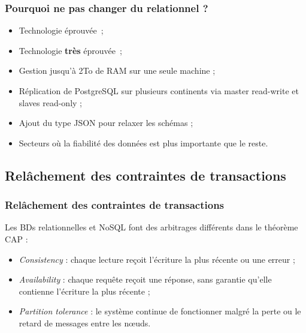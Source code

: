     \begin{frame}
        \frametitle{Pourquoi ne pas changer du relationnel ?}

        \begin{itemize}
            \item Technologie éprouvée ;
            \item Technologie \textbf{très} éprouvée ;
        \end{itemize}

        \begin{itemize}
            \item Gestion jusqu'à 2To de RAM sur une seule machine ;
            \item Réplication de PostgreSQL sur plusieurs continents via master read-write et slaves read-only ;
            \item Ajout du type JSON pour relaxer les schémas ;
            \item Secteurs où la fiabilité des données est plus importante que le reste.
        \end{itemize}
    \end{frame}

    \subsection{Relâchement des contraintes de transactions}
    \begin{frame}
        \frametitle{Relâchement des contraintes de transactions}

        Les BDs relationnelles et NoSQL font des arbitrages différents dans le théorème CAP :
        \begin{itemize}
            \item \textit{Consistency} : chaque lecture reçoit l'écriture la plus récente ou une erreur ;
            \item \textit{Availability} : chaque requête reçoit une réponse, sans garantie qu'elle contienne l'écriture la plus récente ;
            \item \textit{Partition tolerance} : le système continue de fonctionner malgré la perte ou le retard de messages entre les nœuds.
        \end{itemize}
    \end{frame}

